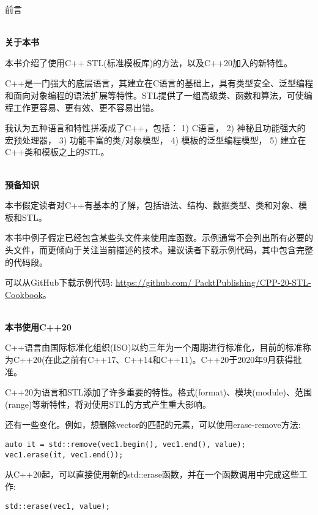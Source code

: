 \begin{flushright}
	 前言
\end{flushright}

\hspace*{\fill} \\ %
\noindent
\textbf{关于本书}

本书介绍了使用C++ STL(标准模板库)的方法，以及C++20加入的新特性。

C++是一门强大的底层语言，其建立在C语言的基础上，具有类型安全、泛型编程和面向对象编程的语法扩展等特性。STL提供了一组高级类、函数和算法，可使编程工作更容易、更有效、更不容易出错。

我认为五种语言和特性拼凑成了C++，包括：
1) C语言，
2) 神秘且功能强大的宏预处理器，
3) 功能丰富的类/对象模型，
4) 模板的泛型编程模型，
5) 建立在C++类和模板之上的STL。

\hspace*{\fill} \\ %
\noindent
\textbf{预备知识}

本书假定读者对C++有基本的了解，包括语法、结构、数据类型、类和对象、模板和STL。

本书中例子假定已经包含某些头文件来使用库函数。示例通常不会列出所有必要的头文件，而更倾向于关注当前描述的技术。建议读者下载示例代码，其中包含完整的代码段。

可以从GitHub下载示例代码: \url{https://github.com/ PacktPublishing/CPP-20-STL-Cookbook}。

\hspace*{\fill} \\ %
\noindent
\textbf{本书使用C++20}

C++语言由国际标准化组织(ISO)以约三年为一个周期进行标准化，目前的标准称为C++20(在此之前有C++17、C++14和C++11)。C++20于2020年9月获得批准。

C++20为语言和STL添加了许多重要的特性。格式(format)、模块(module)、范围(range)等新特性，将对使用STL的方式产生重大影响。

还有一些变化。例如，想删除vector的匹配的元素，可以使用erase-remove方法:

\begin{lstlisting}[style=styleCXX]
auto it = std::remove(vec1.begin(), vec1.end(), value);
vec1.erase(it, vec1.end());
\end{lstlisting}

从C++20起，可以直接使用新的std::erase函数，并在一个函数调用中完成这些工作:

\begin{lstlisting}[style=styleCXX]
std::erase(vec1, value);
\end{lstlisting}

